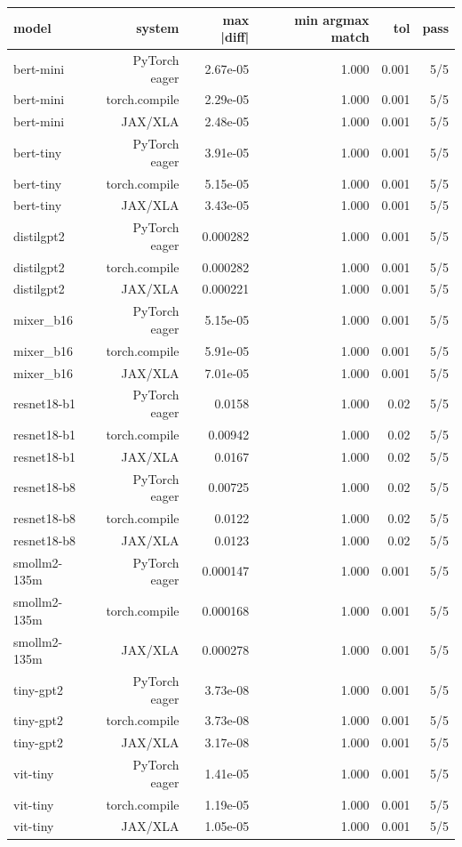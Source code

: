 \begin{tabular}{lrrrrr}
\toprule
model & system & max |diff| & min argmax match & tol & pass \\
\midrule
bert-mini & PyTorch eager & 2.67e-05 & 1.000 & 0.001 & 5/5 \\
bert-mini & torch.compile & 2.29e-05 & 1.000 & 0.001 & 5/5 \\
bert-mini & JAX/XLA & 2.48e-05 & 1.000 & 0.001 & 5/5 \\
bert-tiny & PyTorch eager & 3.91e-05 & 1.000 & 0.001 & 5/5 \\
bert-tiny & torch.compile & 5.15e-05 & 1.000 & 0.001 & 5/5 \\
bert-tiny & JAX/XLA & 3.43e-05 & 1.000 & 0.001 & 5/5 \\
distilgpt2 & PyTorch eager & 0.000282 & 1.000 & 0.001 & 5/5 \\
distilgpt2 & torch.compile & 0.000282 & 1.000 & 0.001 & 5/5 \\
distilgpt2 & JAX/XLA & 0.000221 & 1.000 & 0.001 & 5/5 \\
mixer\_b16 & PyTorch eager & 5.15e-05 & 1.000 & 0.001 & 5/5 \\
mixer\_b16 & torch.compile & 5.91e-05 & 1.000 & 0.001 & 5/5 \\
mixer\_b16 & JAX/XLA & 7.01e-05 & 1.000 & 0.001 & 5/5 \\
resnet18-b1 & PyTorch eager & 0.0158 & 1.000 & 0.02 & 5/5 \\
resnet18-b1 & torch.compile & 0.00942 & 1.000 & 0.02 & 5/5 \\
resnet18-b1 & JAX/XLA & 0.0167 & 1.000 & 0.02 & 5/5 \\
resnet18-b8 & PyTorch eager & 0.00725 & 1.000 & 0.02 & 5/5 \\
resnet18-b8 & torch.compile & 0.0122 & 1.000 & 0.02 & 5/5 \\
resnet18-b8 & JAX/XLA & 0.0123 & 1.000 & 0.02 & 5/5 \\
smollm2-135m & PyTorch eager & 0.000147 & 1.000 & 0.001 & 5/5 \\
smollm2-135m & torch.compile & 0.000168 & 1.000 & 0.001 & 5/5 \\
smollm2-135m & JAX/XLA & 0.000278 & 1.000 & 0.001 & 5/5 \\
tiny-gpt2 & PyTorch eager & 3.73e-08 & 1.000 & 0.001 & 5/5 \\
tiny-gpt2 & torch.compile & 3.73e-08 & 1.000 & 0.001 & 5/5 \\
tiny-gpt2 & JAX/XLA & 3.17e-08 & 1.000 & 0.001 & 5/5 \\
vit-tiny & PyTorch eager & 1.41e-05 & 1.000 & 0.001 & 5/5 \\
vit-tiny & torch.compile & 1.19e-05 & 1.000 & 0.001 & 5/5 \\
vit-tiny & JAX/XLA & 1.05e-05 & 1.000 & 0.001 & 5/5 \\
\bottomrule
\end{tabular}
